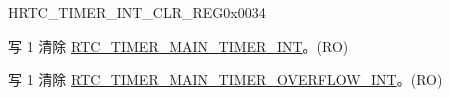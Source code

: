 \begin{register}{H}{RTC\_TIMER\_INT\_CLR\_REG}{0x0034}\label{regdesc:RTCTIMERINTCLRREG}
%
%
%
\regnewline%
\begin{regdesc}\begin{reglist}
\label{fielddesc:RTCTIMERMAINTIMERINTCLR}\item [RTC\_TIMER\_MAIN\_TIMER\_INT\_CLR] 写 1 清除 \hyperref[int:RTCTIMERMAINTIMERINT]{RTC\_TIMER\_MAIN\_TIMER\_INT}。(RO)
\label{fielddesc:RTCTIMERMAINTIMEROVERFLOWINTCLR}\item [RTC\_TIMER\_MAIN\_TIMER\_OVERFLOW\_INT\_CLR]写 1 清除 \hyperref[int:RTCTIMERMAINTIMEROVERFLOWINT]{RTC\_TIMER\_MAIN\_TIMER\_OVERFLOW\_INT}。(RO)
\end{reglist}\end{regdesc}
\end{register}

